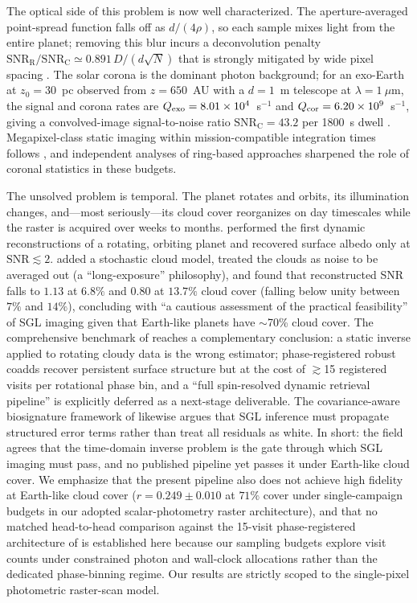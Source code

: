 \documentclass[twocolumn,10pt]{article}
\begin{document}
The optical side of this problem is now well characterized. The
aperture-averaged point-spread function falls off as $d/(4\rho)$, so each
sample mixes light from the entire planet; removing this blur incurs a
deconvolution penalty $\mathrm{SNR_R/SNR_C}\simeq0.891\,D/(d\sqrt{N})$
that is strongly mitigated by wide pixel spacing \citep{toth21,tt22mnras}.
The solar corona is the dominant photon background; for an exo-Earth at
$z_0=30$~pc observed from $z=650$~AU with a $d=1$~m telescope at
$\lambda=1~\mu$m, the signal and corona rates are
$Q_{\rm exo}=8.01\times10^4$~s$^{-1}$ and
$Q_{\rm cor}=6.20\times10^9$~s$^{-1}$, giving a convolved-image
signal-to-noise ratio $\mathrm{SNR_C}=43.2$ per 1800~s dwell
\citep{tt22mnras,tur26bench}. Megapixel-class static imaging within
mission-compatible integration times follows \citep{toth21,tt22mnras},
and independent analyses of ring-based approaches
\citep{mm22} sharpened the role of coronal statistics in these budgets.

The unsolved problem is temporal. The planet rotates and orbits, its
illumination changes, and---most seriously---its cloud cover reorganizes
on day timescales while the raster is acquired over weeks to months.
\citet{toth23} performed the first dynamic reconstructions of a rotating,
orbiting planet and recovered surface albedo only at
$\mathrm{SNR}\lesssim2$. \citet{toth25clouds} added a stochastic cloud
model, treated the clouds as noise to be averaged out (a
``long-exposure'' philosophy), and found that reconstructed SNR falls to $1.13$ at $6.8\%$ and $0.80$ at $13.7\%$ cloud cover (falling below unity between $7\%$ and $14\%$), concluding with ``a cautious
assessment of the practical feasibility'' of SGL imaging given that
Earth-like planets have $\sim$70\% cloud cover. The comprehensive
benchmark of \citet{tur26bench} reaches a complementary conclusion: a
static inverse applied to rotating cloudy data is the wrong estimator;
phase-registered robust coadds recover persistent surface structure but
at the cost of $\gtrsim$15 registered visits per rotational phase bin,
and a ``full spin-resolved dynamic retrieval pipeline'' is explicitly
deferred as a next-stage deliverable. The covariance-aware biosignature
framework of \citet{cov26} likewise argues that SGL inference must
propagate structured error terms rather than treat all residuals as
white. In short: the field agrees that the time-domain inverse problem is
the gate through which SGL imaging must pass, and no published pipeline
yet passes it under Earth-like cloud cover. We emphasize that the present pipeline also does not achieve high fidelity at Earth-like cloud cover ($r = 0.249 \pm 0.010$ at $71\%$ cover under single-campaign budgets in our adopted scalar-photometry raster architecture), and that no matched head-to-head comparison against the 15-visit phase-registered architecture of \citet{tur26bench} is established here because our sampling budgets explore visit counts under constrained photon and wall-clock allocations rather than the dedicated phase-binning regime. Our results are strictly scoped to the single-pixel photometric raster-scan model.
\end{document}
